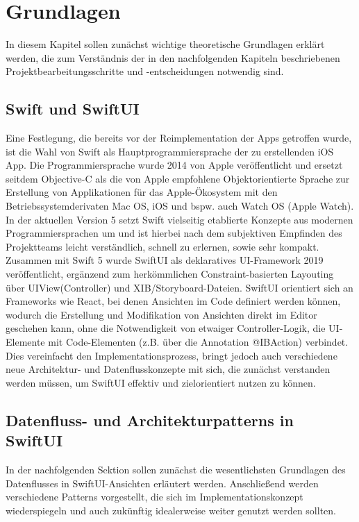 \chapter{Grundlagen}\label{ch:grundlagen}

In diesem Kapitel sollen zunächst wichtige theoretische Grundlagen erklärt werden, die zum Verständnis der in den nachfolgenden Kapiteln beschriebenen Projektbearbeitungsschritte und -entscheidungen notwendig sind.

\section{Swift und SwiftUI}

Eine Festlegung, die bereits vor der Reimplementation der Apps getroffen wurde, ist die Wahl von Swift als Hauptprogrammiersprache der zu erstellenden iOS App. Die Programmiersprache wurde 2014 von Apple veröffentlicht und ersetzt seitdem Objective-C als die von Apple empfohlene Objektorientierte Sprache zur Erstellung von Applikationen für das Apple-Ökosystem mit den Betriebssystemderivaten Mac OS, iOS und bspw. auch Watch OS (Apple Watch). In der aktuellen Version 5 setzt Swift vielseitig etablierte Konzepte aus modernen Programmiersprachen um und ist hierbei nach dem subjektiven Empfinden des Projektteams leicht verständlich, schnell zu erlernen, sowie sehr kompakt. Zusammen mit Swift 5 wurde SwiftUI als deklaratives UI-Framework 2019 veröffentlicht, ergänzend zum herkömmlichen Constraint-basierten Layouting über UIView(Controller) und XIB/Storyboard-Dateien. SwiftUI orientiert sich an Frameworks wie React, bei denen Ansichten im Code definiert werden können, wodurch die Erstellung und Modifikation von Ansichten direkt im Editor geschehen kann, ohne die Notwendigkeit von etwaiger Controller-Logik, die UI-Elemente mit Code-Elementen (z.B. über die Annotation @IBAction) verbindet. Dies vereinfacht den Implementationsprozess, bringt jedoch auch verschiedene neue Architektur- und Datenflusskonzepte mit sich, die zunächst verstanden werden müssen, um SwiftUI effektiv und zielorientiert nutzen zu können.

\section{Datenfluss- und Architekturpatterns in SwiftUI}

In der nachfolgenden Sektion sollen zunächst die wesentlichsten Grundlagen des Datenflusses in SwiftUI-Ansichten erläutert werden. Anschließend werden verschiedene Patterns vorgestellt, die sich im Implementationskonzept wiederspiegeln und auch zukünftig idealerweise weiter genutzt werden sollten.

